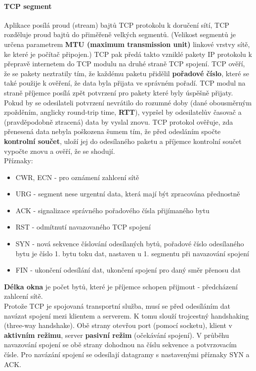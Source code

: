 \documentclass[10pt,a4paper]{article}
\begin{document}
\paragraph{TCP segment}
Aplikace posílá proud (stream) bajtů TCP protokolu k doručení sítí, TCP rozděluje proud bajtů do přiměřeně velkých segmentů. (Velikost segmentů je určena parametrem \textbf{MTU (maximum transmission unit)} linkové vrstvy sítě, ke které je počítač připojen.) TCP pak předá takto vzniklé pakety IP protokolu k přepravě internetem do TCP modulu na druhé straně TCP spojení. TCP ověří, že se pakety neztratily tím, že každému paketu přidělil \textbf{pořadové číslo}, které se také použije k ověření, že data byla přijata ve správném pořadí. TCP modul na straně příjemce posílá zpět potvrzení pro pakety které byly úspěšně přijaty. Pokud by se odesilateli potvrzení nevrátilo do rozumné doby (dané obousměrným zpožděním, anglicky round-trip time, \textbf{RTT}), vypršel by odesilatelův časovač a (pravděpodobně ztracená) data by vyslal znovu. TCP protokol ověřuje, zda přenesená data nebyla poškozena šumem tím, že před odesláním spočte \textbf{kontrolní součet}, uloží jej do odesílaného paketu a příjemce kontrolní součet vypočte znovu a ověří, že se shodují. \\
Příznaky:
\begin{itemize}
	\item CWR, ECN - pro oznámení zahlcení sítě
	\item URG - segment nese urgentní data, která mají být zpracována přednostně
	\item ACK - signalizace správného pořadového čísla přijímaného bytu
	\item RST - odmítnutí navazovaného TCP spojení
	\item SYN - nová sekvence číslování odesílaných bytů, pořadové číslo odesílaného bytu je číslo 1. bytu toku dat, nastaven u 1. segmentu při navazování spojení
	\item FIN - ukončení odesílání dat, ukončení spojení pro daný směr přenosu dat
\end{itemize}
\textbf{Délka okna} je počet bytů, které je příjemce schopen přijmout - předcházení zahlcení sítě. \\
Protože TCP je spojovaná transportní služba, musí se před odesíláním dat navázat spojení mezi klientem a serverem. K tomu slouží trojcestný handshaking (three-way handshake). Obě strany otevřou port (pomocí socketu), klient v \textbf{aktivním režimu}, server \textbf{pasivní režim} (očekávání spojení). V průběhu navazování spojení se obě strany dohodnou na číslu sekvence a potvrzovacím čísle. Pro navázání spojení se odesílají datagramy s nastavenými příznaky SYN a ACK.
\end{document}
